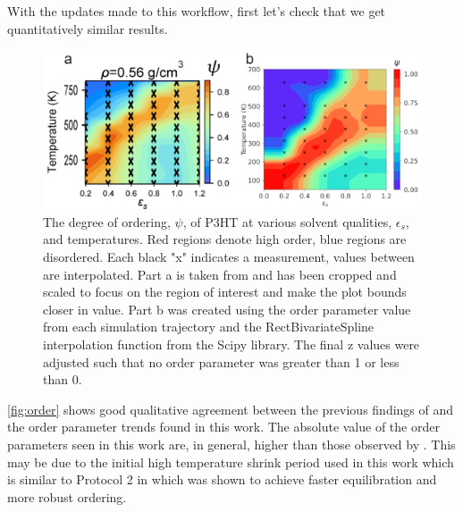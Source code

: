 With the updates made to this workflow, first let's check that we get quantitatively similar results.
\begin{figure}
    \centering
    \includegraphics[width=0.8\linewidth]{figures/p3ht_val/Miller2018_fig3comparison.png}
    \caption[The degree of ordering, $\psi$, of P3HT at various solvent qualities, $\epsilon_{s}$, and temperatures. Red regions denote high order, blue regions are disordered. Each black "x" indicates a measurement, values between are interpolated. Part a is taken from [Ref. Miller et al. Figure 3a and has been cropped and scaled to focus on the region of interest and make the plot bounds closer in value. Part b was created using the order parameter value from each simulation trajectory and the RectBivariateSpline interpolation function from the Scipy library. The final z values were adjusted such that no order parameter was greater than 1 or less than 0.]{The degree of ordering, $\psi$, of P3HT at various solvent qualities, $\epsilon_{s}$, and temperatures. Red regions denote high order, blue regions are disordered. Each black "x" indicates a measurement, values between are interpolated. Part a is taken from \citet[Figure 3a]{Miller2018} and has been cropped and scaled to focus on the region of interest and make the plot bounds closer in value. Part b was created using the order parameter value from each simulation trajectory and the RectBivariateSpline interpolation function from the Scipy library. The final z values were adjusted such that no order parameter was greater than 1 or less than 0.}\label{fig:order}
\end{figure}
\autoref{fig:order} shows good qualitative agreement between the previous findings of \citet{Miller2018} and the order parameter trends found in this work. The absolute value of the order parameters seen in this work are, in general, higher than those observed by \citet{Miller2018}. This may be due to the initial high temperature shrink period used in this work which is similar to Protocol 2 in \citet{Miller2018} which was shown to achieve faster equilibration and more robust ordering.

